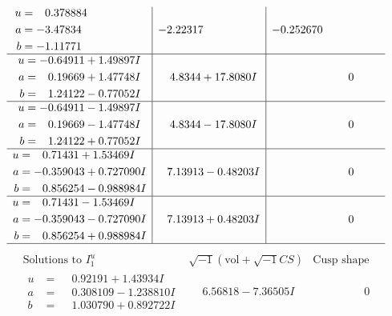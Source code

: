 \documentclass[1p]{elsarticle_modified}
\theoremstyle{definition}
\newcommand{\I}{\sqrt{-1}}
\begin{document}
$$\begin{array}{c|c|c}
\begin{aligned}
u &= \phantom{-}0.378884\phantom{ +0.000000I} \\
a &= -3.47834\phantom{ +0.000000I} \\
b &= -1.11771\phantom{ +0.000000I}\end{aligned}
 & -2.22317\phantom{ +0.000000I} & -0.252670\phantom{ +0.000000I} \\ \hline\begin{aligned}
u &= -0.64911 + 1.49897 I \\
a &= \phantom{-}0.19669 + 1.47748 I \\
b &= \phantom{-}1.24122 - 0.77052 I\end{aligned}
 & \phantom{-}4.8344 + 17.8080 I & \phantom{-0.000000 } 0 \\ \hline\begin{aligned}
u &= -0.64911 - 1.49897 I \\
a &= \phantom{-}0.19669 - 1.47748 I \\
b &= \phantom{-}1.24122 + 0.77052 I\end{aligned}
 & \phantom{-}4.8344 - 17.8080 I & \phantom{-0.000000 } 0 \\ \hline\begin{aligned}
u &= \phantom{-}0.71431 + 1.53469 I \\
a &= -0.359043 + 0.727090 I \\
b &= \phantom{-}0.856254 - 0.988984 I\end{aligned}
 & \phantom{-}7.13913 - 0.48203 I & \phantom{-0.000000 } 0 \\ \hline\begin{aligned}
u &= \phantom{-}0.71431 - 1.53469 I \\
a &= -0.359043 - 0.727090 I \\
b &= \phantom{-}0.856254 + 0.988984 I\end{aligned}
 & \phantom{-}7.13913 + 0.48203 I & \phantom{-0.000000 } 0\\
 \hline 
 \end{array}$$\newpage$$\begin{array}{c|c|c}  
\text{Solutions to }I^u_{1}& \I (\text{vol} + \sqrt{-1}CS) & \text{Cusp shape}\\
 \hline 
\begin{aligned}
u &= \phantom{-}0.92191 + 1.43934 I \\
a &= \phantom{-}0.308109 - 1.238810 I \\
b &= \phantom{-}1.030790 + 0.892722 I\end{aligned}
 & \phantom{-}6.56818 - 7.36505 I & \phantom{-0.000000 } 0 \\ \hline\begin{aligned}

\end{aligned}
\end{array}$$
\end{document}
